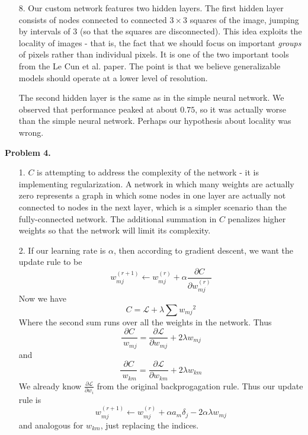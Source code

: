 \documentclass[12pt]{amsart}
\theoremstyle{remark}
\begin{document}
\begin{itemize}
\begin{itemize}
\end{itemize}

\item[8.] Our custom network features two hidden layers. The first hidden layer consists of nodes connected 
to connected $3 \times 3$ squares of the image, jumping by intervals of $3$ (so that the squares are 
disconnected). This idea exploits the locality of images - that is, the fact that we should focus on important 
\emph{groups} of pixels rather than individual pixels. It is one of the two important tools from the Le Cun et 
al. paper. The point is that we believe generalizable models should operate at a lower level of resolution.

The second hidden layer is the same as in the simple neural network. We observed that performance peaked 
at about $0.75$, so it was actually worse than the simple neural network. Perhaps our hypothesis about 
locality was wrong. 

\end{itemize}


\noindent \textbf{Problem 4.}

\begin{itemize}

\item[1.]
$C$ is attempting to address the complexity of the network - it is implementing regularization. A network in which many weights are actually zero represents a graph in which some nodes in one layer are actually not connected to nodes in the next layer, which is a simpler scenario than the fully-connected network. The additional summation in $C$ penalizes higher weights so that the network will limit its complexity.

\item[2.]
If our learning rate is $\alpha$, then according to gradient descent, we want the update rule to be 
\[
w_{mj}^{(r+1)} \leftarrow w_{mj}^{(r)} + \alpha \frac{\partial C}{\partial w_{mj}^{(r)}}
\]
Now we have
\[
C=\mathcal{L}+\lambda \sum {w_{mj}}^2
\]
Where the second sum runs over all the weights in the network.
Thus
\[
\frac{\partial C}{\ w_{mj}} = \frac{\partial \mathcal{L}}{\partial w_{mj}}+2\lambda w_{mj}
\]
and 
\[
\frac{\partial C}{\ w_{km}} = \frac{\partial \mathcal{L}}{\partial w_{km}}+2\lambda w_{km}
\]
We already know $\frac{\partial \mathcal{L}}{\partial w_i}$ from the original backprogagation rule. Thus our update rule is
\[
w_{mj}^{(r+1)} \leftarrow w_{mj}^{(r)}+\alpha a_{m}\delta_j-2\alpha\lambda w_{mj}
\]
and analogous for $w_{km}$, just replacing the indices. 
\end{itemize}
\end{document}
